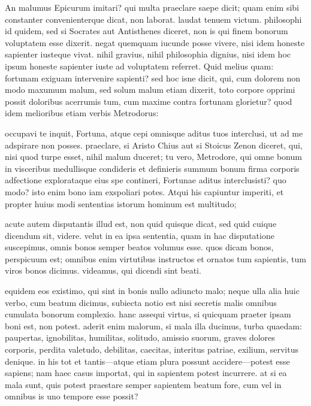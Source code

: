  An malumus Epicurum imitari? qui multa praeclare saepe dicit; quam enim sibi constanter convenienterque dicat, non laborat. laudat tenuem victum. philosophi id quidem, sed si Socrates aut Antisthenes diceret, non is qui finem bonorum voluptatem esse dixerit. negat quemquam iucunde posse vivere, nisi idem honeste sapienter iusteque vivat. nihil gravius, nihil philosophia dignius, nisi idem hoc ipsum honeste sapienter iuste ad voluptatem referret. Quid melius quam: fortunam exiguam intervenire sapienti? sed hoc isne dicit, qui, cum dolorem non modo maxumum malum, sed solum malum etiam dixerit, toto corpore opprimi possit doloribus acerrumis tum, cum maxime contra fortunam glorietur? quod idem melioribus etiam verbis Metrodorus:

 occupavi te inquit, Fortuna, atque cepi omnisque aditus tuos interclusi, ut ad me adspirare non posses. praeclare, si Aristo Chius aut si Stoicus Zenon diceret, qui, nisi quod turpe esset, nihil malum duceret; tu vero, Metrodore, qui omne bonum in visceribus medullisque condideris et definieris summum bonum firma corporis adfectione explorataque eius spe contineri, Fortunae aditus interclusisti? quo modo? isto enim bono iam exspoliari potes. Atqui his capiuntur imperiti, et propter huius modi sententias istorum hominum est multitudo;

 acute autem disputantis illud est, non quid quisque dicat, sed quid cuique dicendum sit, videre. velut in ea ipsa sententia, quam in hac disputatione suscepimus, omnis bonos semper beatos volumus esse. quos dicam bonos, perspicuum est; omnibus enim virtutibus instructos et ornatos tum sapientis, tum viros bonos dicimus. videamus, qui dicendi sint beati.

 equidem eos existimo, qui sint in bonis nullo adiuncto malo; neque ulla alia huic verbo, cum beatum dicimus, subiecta notio est nisi secretis malis omnibus cumulata bonorum complexio. hanc assequi virtus, si quicquam praeter ipsam boni est, non potest. aderit enim malorum, si mala illa ducimus, turba quaedam: paupertas, ignobilitas, humilitas, solitudo, amissio suorum, graves dolores corporis, perdita valetudo, debilitas, caecitas, interitus patriae, exilium, servitus denique. in his tot et tantis—atque etiam plura possunt accidere—potest esse sapiens; nam haec casus importat, qui in sapientem potest incurrere. at si ea mala sunt, quis potest praestare semper sapientem beatum fore, cum vel in omnibus is uno tempore esse possit?

